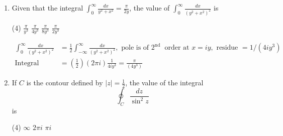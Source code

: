 \begin{enumerate}[label=\color{ocre}\textbf{\arabic*.}]
	{}
	\begin{tasks}(4)
		\task[\textbf{A.}] $x^{2} y$
		\task[\textbf{B.}]  $x^{2}-y^{2}$
		\task[\textbf{C.}] $x^{3}-3 x y^{2}$
		\task[\textbf{D.}] $3 x^{2} y-y-y^{3}$
	\end{tasks}
	\begin{answer}
		\begin{align*}
		\intertext{ Let $x^{2} y$ be real part of a complex function. Use Milne Thomson's method to write analytic complex function. The real part of that function should be (1) but that is not the case. So this cannot be real part of an analytic function. Also,}
		z^{2}&=(x+i y)^{2}=x^{2}-y^{2}+2 i x y,\text{ Real part option (2)}\\
		z^{3}&=(x+i y)^{3}=x^{3}-i y^{3}+3 i x y(x+i y)\\
		&=x^{3}-i y^{3}+3 i x^{2} y-3 x y^{2},\text{ Real part option (3)}
		\end{align*}
		So the correct answer is \textbf{Option (A)}
	\end{answer}
	\item  Given that the integral $\int_{0}^{\infty} \frac{d x}{y^{2}+x^{2}}=\frac{\pi}{2 y}$, the value of $\int_{0}^{\infty} \frac{d x}{\left(y^{2}+x^{2}\right)^{2}}$ is
	{}
	\begin{tasks}(4)
		\task[\textbf{A.}] $\frac{\pi}{y^{3}}$
		\task[\textbf{B.}] $\frac{\pi}{4 y^{3}}$
		\task[\textbf{C.}]  $\frac{\pi}{8 y^{3}}$
		\task[\textbf{D.}] $\frac{\pi}{2 y^{3}}$
	\end{tasks}
	\begin{answer}
		\begin{align*}
		\int_{0}^{\infty} \frac{d x}{\left(y^{2}+x^{2}\right)^{2}}&=\frac{1}{2} \int_{-\infty}^{\infty} \frac{d x}{\left(y^{2}+x^{2}\right)^{2}},\text{ pole is of }2^{\text {nd }}\text{ order at }x=i y,\text{ residue }=1 /\left(4 i y^{3}\right)\\
		\text{Integral }&=\left(\frac{1}{2}\right)(2 \pi i) \frac{1}{4 i y^{3}}=\frac{\pi}{\left(4 y^{3}\right)}
		\end{align*}
	\end{answer}
	\item If $C$ is the contour defined by $|z|=\frac{1}{2}$, the value of the integral
	$$
	\oint_{C} \frac{d z}{\sin ^{2} z}
	$$
	is
	{}
	\begin{tasks}(4)
		\task[\textbf{A.}] $\infty$
		\task[\textbf{B.}] $2 \pi i$
		\task[\textbf{D.}] $\pi i$
	\end{tasks}

\end{enumerate}
